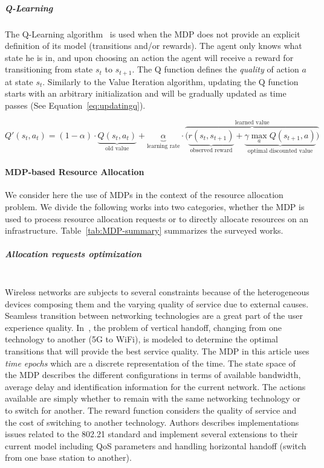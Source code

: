 \subparagraph{Q-Learning}
The Q-Learning algorithm~\cite{qlearning} is used when the MDP does not provide an explicit definition of its model (\ie transitions and/or rewards).
The agent only knows what state he is in, and upon choosing an action the agent will receive a reward for transitioning from state $s_t$ to $s_{t+1}$.
The Q function defines the \textit{quality} of action $a$ at state $s_t$.
Similarly to the Value Iteration algorithm, updating the Q function starts with an arbitrary initialization and will be gradually updated as time passes (See Equation~\eqref{eq:updatingq}).

\begin{equation}\label{eq:updatingq}
Q'(s_{t},a_{t}) = (1-\alpha) \cdot \underbrace{Q(s_{t},a_{t})}_{\text{old value}} + \underbrace{\alpha}_{\text{learning rate}} \cdot  \overbrace{\bigg( \underbrace{r(s_t,s_{t+1})}_{\text{observed reward}} + \underbrace{\gamma \max_{a}Q(s_{t+1}, a)}_{\text{optimal discounted value}} \bigg) }^{\text{learned value}}
\end{equation}



\paragraph{MDP-based Resource Allocation}
\textbf{\newline}
We consider here the use of MDPs in the context of the resource allocation problem.
We divide the following works into two categories, whether the MDP is used to process resource allocation requests or to directly allocate resources on an infrastructure.
Table~\ref{tab:MDP-summary} summarizes the surveyed works.

\subparagraph{Allocation requests optimization}
\textbf{\\}
Wireless networks are subjects to several constraints because of the heterogeneous devices composing them and the varying quality of service due to external causes. Seamless transition between networking technologies are a great part of the user experience quality. In~\cite{navarro2008}, the problem of vertical handoff, \ie changing from one technology to another (\eg 5G to WiFi), is modeled to determine the optimal transitions that will provide the best service quality. 
The MDP in this article uses \textit{time epochs} which are a discrete representation of the time.
The state space of the MDP describes the different configurations in terms of available bandwidth, average delay and identification information for the current network.
The actions available are simply whether to remain with the same networking technology or to switch for another. The reward function considers the quality of service and the cost of switching to another technology.
Authors describes implementations issues related to the 802.21 standard and implement several extensions to their current model including QoS parameters and handling horizontal handoff (\ie switch from one base station to another).


